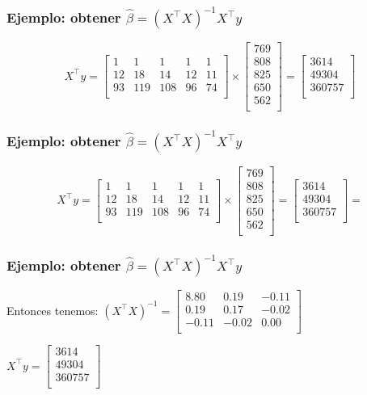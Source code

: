 \documentclass{beamer}
\begin{document}
\begin{frame}
\frametitle{Ejemplo: obtener $\hat{\beta} = (X^\top X)^{-1}X^\top y$}


\[
X^\top y =
\begin{bmatrix}
1 & 1 & 1 & 1 & 1 \\
12 & 18 & 14 & 12 & 11 \\
93 & 119 & 108 & 96 & 74 \\
\end{bmatrix}
\times
\begin{bmatrix}
769 \\
808 \\
825 \\
650 \\
562 \\
\end{bmatrix}
= \begin{bmatrix}
3614 \\
49304 \\
360757 \\
\end{bmatrix} 
\]
\end{frame}
\begin{frame}
\frametitle{Ejemplo: obtener $\hat{\beta} = (X^\top X)^{-1}X^\top y$}


\[
X^\top y =
\begin{bmatrix}
1 & 1 & 1 & 1 & 1 \\
12 & 18 & 14 & 12 & 11 \\
93 & 119 & 108 & 96 & 74 \\
\end{bmatrix}
\times
\begin{bmatrix}
769 \\
808 \\
825 \\
650 \\
562 \\
\end{bmatrix}
= \begin{bmatrix}
3614 \\
49304 \\
360757 \\
\end{bmatrix} = \]
% 
\end{frame}
\begin{frame}
\frametitle{Ejemplo: obtener $\hat{\beta} = (X^\top X)^{-1}X^\top y$}

Entonces tenemos: $(X^{\top}X)^{-1} = 
\begin{bmatrix}
8.80 & 0.19 & -0.11 \\
0.19 & 0.17 & -0.02 \\
-0.11 & -0.02 & 0.00 \\
\end{bmatrix}$

$X^{\top}y = 
\begin{bmatrix}
3614 \\
49304 \\
360757 \\
\end{bmatrix}$
\end{frame}
\end{document}
